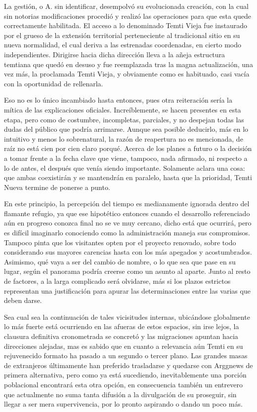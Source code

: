 \documentclass[
]{book}
\begin{document}
La gestión, o A. sin identificar, desempolvó su evolucionada creación, con la cual sin notorias modificaciones procedió y realizó las operaciones para que esta quede correctamente habilitada. El acceso a lo denominado Temti Vieja fue instaurado por el grueso de la extensión territorial perteneciente al tradicional sitio en su nueva normalidad, el cual deriva a las estrenadas coordenadas, en cierto modo independientes. Dirigirse hacia dicha dirección lleva a la añeja estructura temtiana que quedó en desuso y fue reemplazada tras la magna actualización, una vez más, la proclamada Temti Vieja, y obviamente como es habituado, casi vacía con la oportunidad de rellenarla.

Eso no es lo único incambiado hasta entonces, pues otra reiteración sería la mítica de las explicaciones oficiales. Increíblemente, se hacen presentes en esta etapa, pero como de costumbre, incompletas, parciales, y no despejan todas las dudas del público que podría arrimarse. Aunque sea posible deducirlo, más en lo intuitivo y menos lo sobrenatural, la razón de reapertura no es mencionada, de raíz no está cien por cien claro porqué. Acerca de los planes a futuro o la decisión a tomar frente a la fecha clave que viene, tampoco, nada afirmado, ni respecto a lo de antes, el después que venía siendo importante. Solamente aclara una cosa: que ambas coexistirán y se mantendrán en paralelo, hasta que la prioridad, Temti Nueva termine de ponerse a punto.

En este principio, la percepción del tiempo es medianamente ignorada dentro del flamante refugio, ya que ese hipotético entonces cuando el desarrollo referenciado aún en progreso conozca final no se ve muy cercano, dicho está que ocurrirá, pero es difícil imaginarlo conociendo como la administración maneja sus compromisos. Tampoco pinta que los visitantes opten por el proyecto renovado, sobre todo considerando sus mayores carencias hasta con los más apegados y acostumbrados. Asimismo, qué vaya a ser del cambio de nombre, o lo que sea que pase en su lugar, según el panorama podría creerse como un asunto al aparte. Junto al resto de factores, a la larga complicado será olvidarse, más si los plazos estrictos representan una justificación para apurar las determinaciones entre las varias que deben darse.

Sea cual sea la continuación de tales vicisitudes internas, ubicándose globalmente lo más fuerte está ocurriendo en las afueras de estos espacios, sin irse lejos, la clausura definitiva cronometrada se concretó y las migraciones apuntan hacia direcciones alejadas, mas es sabido que en cuanto a relevancia aún Temti en su rejuvenecido formato ha pasado a un segundo o tercer plano. Las grandes masas de extranjeros últimamente han preferido trasladarse y quedarse con Arggnews de primera alternativa, pero como ya está sucediendo, inevitablemente una porción poblacional encontrará esta otra opción, en consecuencia también un entrevero que actualmente no suma tanta difusión a la divulgación de su proseguir, sin llegar a ser mera supervivencia, por lo pronto aspirando o dando un poco más.
\end{document}
